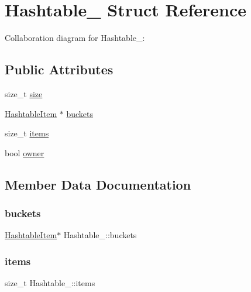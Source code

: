 \hypertarget{structHashtable__}{}\section{Hashtable\+\_\+ Struct Reference}
\label{structHashtable__}


Collaboration diagram for Hashtable\+\_\+\+:
\subsection*{Public Attributes}
\begin{DoxyCompactItemize}
\item 
size\+\_\+t \hyperlink{structHashtable___adc6490e343a67bd23b655e3950dbb214}{size}
\item 
\hyperlink{Hashtable_8c_a7292da8f5d4ea8cdb0ceca529d87efbe}{Hashtable\+Item} $\ast$ \hyperlink{structHashtable___ad8dfa739a9ecd3863d30735a094c37c9}{buckets}
\item 
size\+\_\+t \hyperlink{structHashtable___a3a39431efd8f0587a00b87d03a50202f}{items}
\item 
bool \hyperlink{structHashtable___a57e38588312b0f1a8805fd490f2da519}{owner}
\end{DoxyCompactItemize}


\subsection{Member Data Documentation}
\mbox{\label{structHashtable___ad8dfa739a9ecd3863d30735a094c37c9}} 
\subsubsection{\texorpdfstring{buckets}{buckets}}
{\footnotesize\ttfamily \hyperlink{Hashtable_8c_a7292da8f5d4ea8cdb0ceca529d87efbe}{Hashtable\+Item}$\ast$ Hashtable\+\_\+\+::buckets}

\mbox{\label{structHashtable___a3a39431efd8f0587a00b87d03a50202f}} 
\subsubsection{\texorpdfstring{items}{items}}
{\footnotesize\ttfamily size\+\_\+t Hashtable\+\_\+\+::items}

